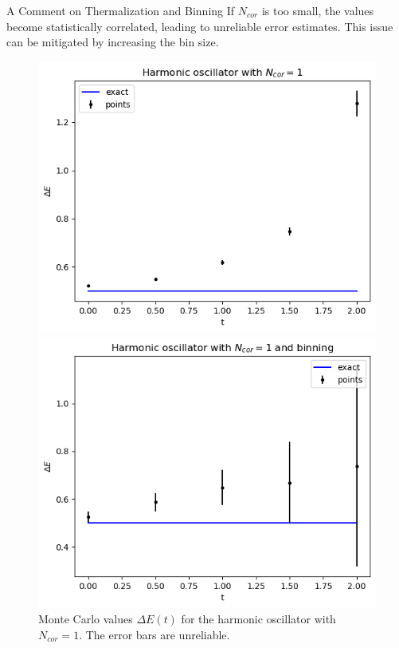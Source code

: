 \documentclass{beamer}
\begin{document}
\begin{frame}{A Comment on Thermalization and Binning}
    If $N_{cor}$ is too small, the values become statistically correlated, leading to unreliable error estimates. This issue can be mitigated by increasing the bin size.

    \begin{figure}[ht]
    \begin{minipage}[b]{0.4\linewidth}
        \centering
        \includegraphics[width=\textwidth]{harmonic_oscillator_with_low_thermalization.png}
        \caption{Monte Carlo values $\Delta E(t)$ for the harmonic oscillator with $N_{cor}=1$. The error bars are unreliable.}
        \label{fig:harmonic_oscillator_with_low_thermalization}
    \end{minipage}
    \hspace{0.5cm}
    \begin{minipage}[b]{0.4\linewidth}
        \centering
        \includegraphics[width=\textwidth]{harmonic_oscillator_with_low_thermalization_and_binning.png}

\end{minipage}
\end{figure}
\end{frame}
\end{document}
